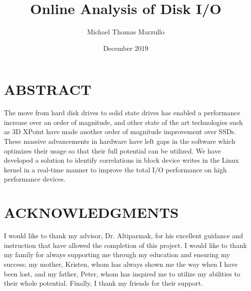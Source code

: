 \documentclass[MEng]{uofl}
\begin{document}
\title{Online Analysis of Disk I/O}
\author{Michael Thomas Marzullo}


\date{December 2019}
\maketitle

\chapter*{ABSTRACT}
The move from hard disk drives to solid state drives has enabled a performance increase over an order of magnitude, 
and other state of the art technologies such as 3D XPoint have made another order of magnitude improvement over SSDs. 
These massive advancements in hardware have left gaps in the software which optimizes their usage so that their full 
potential can be utilized. We have developed a solution to identify correlations in block device writes in the Linux 
kernel in a real-time manner to improve the total I/O performance on high performance devices.

\chapter*{ACKNOWLEDGMENTS}
I would like to thank my advisor, Dr. Altiparmak, for his excellent guidance 
and instruction that have allowed the completion of this project. I would like to 
thank my family for always supporting me through my education and ensuring my 
success; my mother, Kristen, whom has always shown me the way when I have been 
lost, and my father, Peter, whom has inspired me to utilize my abilities to their
whole potential. Finally, I thank my friends for their support.

\blockofcontents
\end{document}
